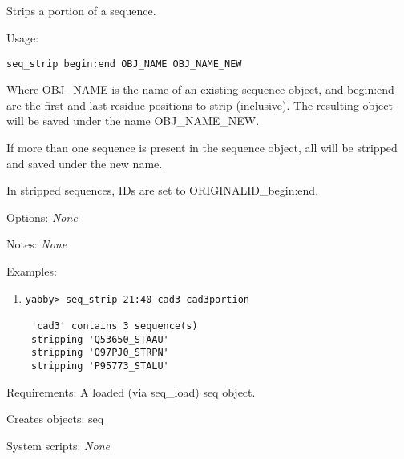 

\subsection[seq\_strip]{  }



Strips a portion of a sequence.


\begin{description}


\item{Usage:}

{\tt seq\_strip begin:end OBJ\_NAME OBJ\_NAME\_NEW}

Where OBJ\_NAME is the name of an existing sequence object, and
begin:end are the first and last residue positions to strip (inclusive).
The resulting object will be saved under the name OBJ\_NAME\_NEW.

If more than one sequence is present in the sequence object,
all will be stripped and saved under the new name.

In stripped sequences, IDs are set to ORIGINALID\_begin:end.


\item{Options:} {\em None}


\item{Notes:} {\em None}


\item{Examples:}
\begin{enumerate}

\item
\begin{verbatim}
yabby> seq_strip 21:40 cad3 cad3portion

 'cad3' contains 3 sequence(s)
 stripping 'Q53650_STAAU'
 stripping 'Q97PJ0_STRPN'
 stripping 'P95773_STALU'

\end{verbatim}

\end{enumerate}


\item{Requirements:} A loaded (via seq\_load) seq object.


\item{Creates objects:} seq


\item{System scripts:} {\em None}

\end{description}

